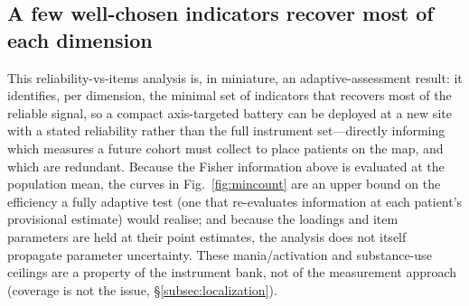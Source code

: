 \subsection{A few well-chosen indicators recover most of each dimension}

This reliability-vs-items analysis is, in miniature, an adaptive-assessment result: it
identifies, per dimension, the minimal set of indicators that recovers most of the
reliable signal, so a compact axis-targeted battery can be deployed at a new site with a
stated reliability rather than the full instrument set---directly informing which
measures a future cohort must collect to place patients on the map, and which are
redundant. Because the Fisher information above is evaluated at the population mean, the
curves in Fig.~\ref{fig:mincount} are an upper bound on the efficiency a fully adaptive
test (one that re-evaluates information at each patient's provisional estimate) would
realise; and because the loadings and item parameters are held at their point estimates,
the analysis does not itself propagate parameter uncertainty. These mania/activation and substance-use ceilings are a property of the instrument bank, not of the measurement approach (coverage is not the issue, \S\ref{subsec:localization}).

